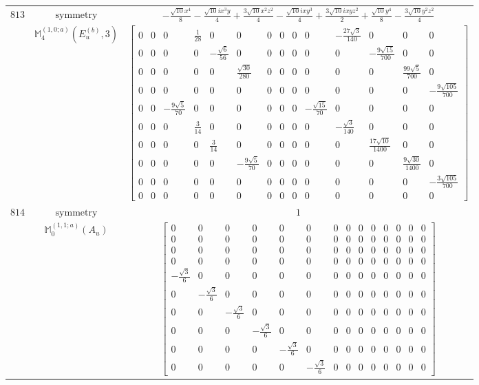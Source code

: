 \documentclass[fleqn,8pt,landscape]{jsarticle}
\begin{document}
\begin{longtable}{ccc}
$ 813 $ & $ \text{symmetry} $ & $ - \frac{\sqrt{10} x^{4}}{8} - \frac{\sqrt{10} i x^{3} y}{4} + \frac{3 \sqrt{10} x^{2} z^{2}}{4} - \frac{\sqrt{10} i x y^{3}}{4} + \frac{3 \sqrt{10} i x y z^{2}}{2} + \frac{\sqrt{10} y^{4}}{8} - \frac{3 \sqrt{10} y^{2} z^{2}}{4} $ \\
$  $ & $ \mathbb{M}_{4}^{(1,0;a)}(E_{u}^{(b)},3) $ & $ \begin{bmatrix} 0 & 0 & 0 & \frac{1}{28} & 0 & 0 & 0 & 0 & 0 & 0 & - \frac{27 \sqrt{3}}{140} & 0 & 0 & 0 \\ 0 & 0 & 0 & 0 & - \frac{\sqrt{6}}{56} & 0 & 0 & 0 & 0 & 0 & 0 & - \frac{9 \sqrt{15}}{700} & 0 & 0 \\ 0 & 0 & 0 & 0 & 0 & \frac{\sqrt{30}}{280} & 0 & 0 & 0 & 0 & 0 & 0 & \frac{99 \sqrt{5}}{700} & 0 \\ 0 & 0 & 0 & 0 & 0 & 0 & 0 & 0 & 0 & 0 & 0 & 0 & 0 & - \frac{9 \sqrt{105}}{700} \\ 0 & 0 & - \frac{9 \sqrt{5}}{70} & 0 & 0 & 0 & 0 & 0 & 0 & - \frac{\sqrt{15}}{70} & 0 & 0 & 0 & 0 \\ 0 & 0 & 0 & \frac{3}{14} & 0 & 0 & 0 & 0 & 0 & 0 & - \frac{\sqrt{3}}{140} & 0 & 0 & 0 \\ 0 & 0 & 0 & 0 & \frac{3}{14} & 0 & 0 & 0 & 0 & 0 & 0 & \frac{17 \sqrt{10}}{1400} & 0 & 0 \\ 0 & 0 & 0 & 0 & 0 & - \frac{9 \sqrt{5}}{70} & 0 & 0 & 0 & 0 & 0 & 0 & \frac{9 \sqrt{30}}{1400} & 0 \\ 0 & 0 & 0 & 0 & 0 & 0 & 0 & 0 & 0 & 0 & 0 & 0 & 0 & - \frac{3 \sqrt{105}}{700} \\ 0 & 0 & 0 & 0 & 0 & 0 & 0 & 0 & 0 & 0 & 0 & 0 & 0 & 0 \end{bmatrix} $ \\ \hline
$ 814 $ & $ \text{symmetry} $ & $ 1 $ \\
$  $ & $ \mathbb{M}_{0}^{(1,1;a)}(A_{u}) $ & $ \begin{bmatrix} 0 & 0 & 0 & 0 & 0 & 0 & 0 & 0 & 0 & 0 & 0 & 0 & 0 & 0 \\ 0 & 0 & 0 & 0 & 0 & 0 & 0 & 0 & 0 & 0 & 0 & 0 & 0 & 0 \\ 0 & 0 & 0 & 0 & 0 & 0 & 0 & 0 & 0 & 0 & 0 & 0 & 0 & 0 \\ 0 & 0 & 0 & 0 & 0 & 0 & 0 & 0 & 0 & 0 & 0 & 0 & 0 & 0 \\ - \frac{\sqrt{3}}{6} & 0 & 0 & 0 & 0 & 0 & 0 & 0 & 0 & 0 & 0 & 0 & 0 & 0 \\ 0 & - \frac{\sqrt{3}}{6} & 0 & 0 & 0 & 0 & 0 & 0 & 0 & 0 & 0 & 0 & 0 & 0 \\ 0 & 0 & - \frac{\sqrt{3}}{6} & 0 & 0 & 0 & 0 & 0 & 0 & 0 & 0 & 0 & 0 & 0 \\ 0 & 0 & 0 & - \frac{\sqrt{3}}{6} & 0 & 0 & 0 & 0 & 0 & 0 & 0 & 0 & 0 & 0 \\ 0 & 0 & 0 & 0 & - \frac{\sqrt{3}}{6} & 0 & 0 & 0 & 0 & 0 & 0 & 0 & 0 & 0 \\ 0 & 0 & 0 & 0 & 0 & - \frac{\sqrt{3}}{6} & 0 & 0 & 0 & 0 & 0 & 0 & 0 & 0 \end{bmatrix} $ \\ \hline

\end{longtable}
\end{document}

